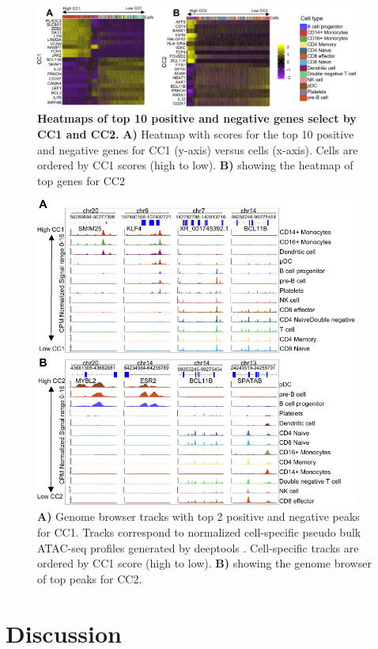 \begin{figure}[!ht]
	\centering
	\includegraphics[width=0.95\textwidth]{CC_Genes/fig}
	\vspace{0.1cm}
	\caption[Heatmaps of top 10 positive and negative genes select by CC1 and CC2.]{\textbf{Heatmaps of top 10 positive and negative genes select by CC1 and CC2.} \textbf{A)} Heatmap with scores for the top 10 positive and negative genes for CC1 (y-axis) versus cells (x-axis). Cells are ordered by CC1 scores (high to low). \textbf{B)} showing the heatmap of top genes for CC2}
	\label{fig:CC_Genes}
\end{figure}


\begin{figure}[!ht]
	\centering
	\includegraphics[width=0.95\textwidth]{CC_Peaks/fig}
	\vspace{0.1cm}
	\caption[Genome browser tracks of top 2 positive and negative peaks for CC1 and CC2.]{ \textbf{A)} Genome browser tracks with top 2 positive and negative peaks for CC1. Tracks correspond to normalized cell-specific pseudo bulk ATAC-seq profiles generated by deeptools \citep{ramirez2016deeptools2}. Cell-specific tracks are ordered by CC1 score (high to low). \textbf{B)} showing the genome browser of top peaks for CC2.}
	\label{fig:CC_Peaks}
\end{figure}

\section{Discussion}



